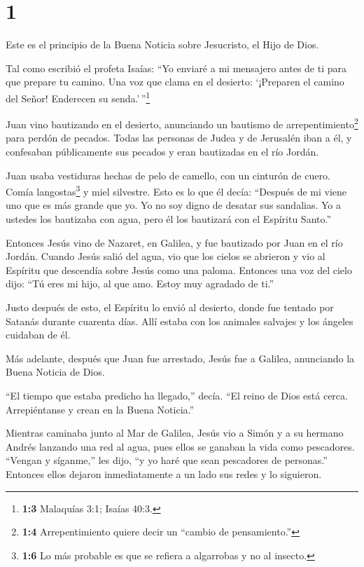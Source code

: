 \hypertarget{section}{%
\section{1}\label{section}}

 Este es el principio de la Buena Noticia sobre Jesucristo,
el Hijo de Dios.

 Tal como escribió el profeta Isaías: ``Yo enviaré a mi
mensajero antes de ti para que prepare tu camino.  Una voz
que clama en el desierto: `¡Preparen el camino del Señor! Enderecen su
senda.'\,''\footnote{\textbf{1:3} Malaquías 3:1; Isaías 40:3.}

 Juan vino bautizando en el desierto, anunciando un bautismo
de arrepentimiento\footnote{\textbf{1:4} Arrepentimiento quiere decir un
  ``cambio de pensamiento.''} para perdón de pecados.  Todas
las personas de Judea y de Jerusalén iban a él, y confesaban
públicamente sus pecados y eran bautizadas en el río Jordán.

 Juan usaba vestiduras hechas de pelo de camello, con un
cinturón de cuero. Comía langostas\footnote{\textbf{1:6} Lo más probable
  es que se refiera a algarrobas y no al insecto.} y miel silvestre.
 Esto es lo que él decía: ``Después de mi viene uno que es
más grande que yo. Yo no soy digno de desatar sus sandalias.
 Yo a ustedes los bautizaba con agua, pero él los bautizará
con el Espíritu Santo.''

 Entonces Jesús vino de Nazaret, en Galilea, y fue bautizado
por Juan en el río Jordán.  Cuando Jesús salió del agua,
vio que los cielos se abrieron y vio al Espíritu que descendía sobre
Jesús como una paloma.  Entonces una voz del cielo dijo:
``Tú eres mi hijo, al que amo. Estoy muy agradado de ti.''

 Justo después de esto, el Espíritu lo envió al desierto,
 donde fue tentado por Satanás durante cuarenta días. Allí
estaba con los animales salvajes y los ángeles cuidaban de él.

 Más adelante, después que Juan fue arrestado, Jesús fue a
Galilea, anunciando la Buena Noticia de Dios.

 ``El tiempo que estaba predicho ha llegado,'' decía. ``El
reino de Dios está cerca. Arrepiéntanse y crean en la Buena Noticia.''

 Mientras caminaba junto al Mar de Galilea, Jesús vio a
Simón y a su hermano Andrés lanzando una red al agua, pues ellos se
ganaban la vida como pescadores.  ``Vengan y síganme,'' les
dijo, ``y yo haré que sean pescadores de personas.'' 
Entonces ellos dejaron inmediatamente a un lado sus redes y lo
siguieron.

